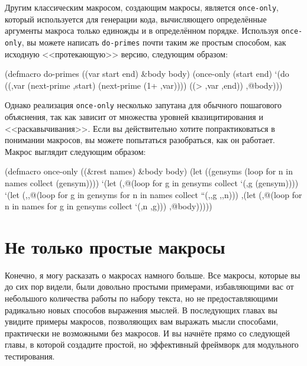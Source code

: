 Другим классическим макросом, создающим макросы, является \lstinline{once-only}, который
используется для генерации кода, вычисляющего определённые аргументы макроса только
единожды и в определённом порядке. Используя \lstinline{once-only}, вы можете написать
\lstinline{do-primes} почти таким же простым способом, как исходную <<протекающую>> версию,
следующим образом:

\begin{myverb}
(defmacro do-primes ((var start end) &body body)
  (once-only (start end)
    `(do ((,var (next-prime ,start) (next-prime (1+ ,var))))
         ((> ,var ,end))
       ,@body)))
\end{myverb}

Однако реализация \lstinline{once-only} несколько запутана для обычного пошагового
объяснения, так как зависит от множества уровней квазицитирования и <<раскавычивания>>. Если
вы действительно хотите попрактиковаться в понимании макросов, вы можете попытаться
разобраться, как он работает. Макрос выглядит следующим образом:

\begin{myverb}
(defmacro once-only ((&rest names) &body body)
  (let ((gensyms (loop for n in names collect (gensym))))
    `(let (,@(loop for g in gensyms collect `(,g (gensym))))
      `(let (,,@(loop for g in gensyms for n in names collect ``(,,g ,,n)))
        ,(let (,@(loop for n in names for g in gensyms collect `(,n ,g)))
           ,@body)))))
\end{myverb}

\section{Не только простые макросы}

Конечно, я могу расказать о макросах намного больше. Все макросы, которые вы до сих пор
видели, были довольно простыми примерами, избавляющими вас от небольшого количества работы
по набору текста, но не предоставляющими радикально новых способов выражения мыслей. В
последующих главах вы увидите примеры макросов, позволяющих вам выражать мысли способами,
практически не возможными без макросов. И вы начнёте прямо со следующей главы, в которой
создадите простой, но эффективный фреймворк для модульного тестирования.

